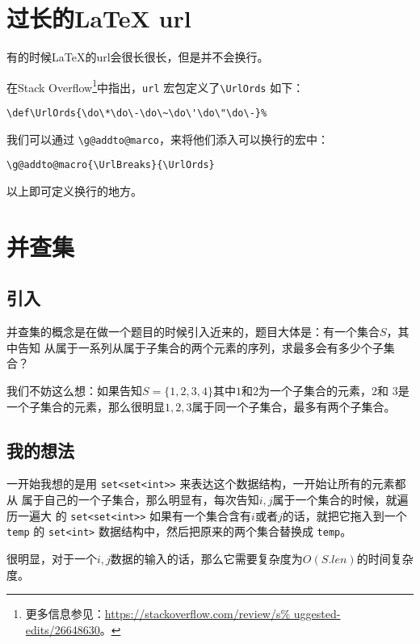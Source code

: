 
\section{过长的\LaTeX{} url}

有的时候\LaTeX{}的url会很长很长，但是并不会换行。

在Stack Overflow\footnote{更多信息参见：\url{https://stackoverflow.com/review/s%
uggested-edits/26648630}。}中指出，\verb|url| 宏包定义了\verb|\UrlOrds| 如下：
\begin{lstlisting}
\def\UrlOrds{\do\*\do\-\do\~\do\'\do\"\do\-}%
\end{lstlisting}

我们可以通过 \verb|\g@addto@marco|，来将他们添入可以换行的宏中：
\begin{lstlisting}
\g@addto@macro{\UrlBreaks}{\UrlOrds}
\end{lstlisting}

以上即可定义换行的地方。


\section{并查集}

\subsection{引入}

并查集的概念是在做一个题目的时候引入近来的，题目大体是：有一个集合$S$，其中告知
从属于一系列从属于子集合的两个元素的序列，求最多会有多少个子集合？

我们不妨这么想：如果告知$S=\{1, 2, 3, 4\}$其中$1$和$2$为一个子集合的元素，$2$和%
$3$是一个子集合的元素，那么很明显$1,2,3$属于同一个子集合，最多有两个子集合。

\subsection{我的想法}

一开始我想的是用 \verb|set<set<int>>| 来表达这个数据结构，一开始让所有的元素都从
属于自己的一个子集合，那么明显有，每次告知$i,j$属于一个集合的时候，就遍历一遍大
的 \verb|set<set<int>>| 如果有一个集合含有$i$或者$j$的话，就把它拖入到一个
\verb|temp| 的 \verb|set<int>| 数据结构中，然后把原来的两个集合替换成 \verb|temp|。

很明显，对于一个$i,j$数据的输入的话，那么它需要复杂度为$O(S.len)$的时间复杂度。

